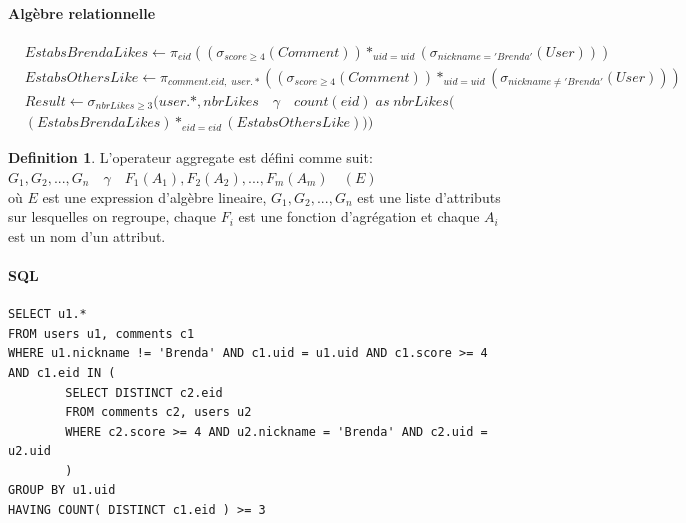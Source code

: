 \documentclass[11pt,a4paper]{report}
\begin{document}
\paragraph*{Algèbre relationnelle}
\begin{align*}
& EstabsBrendaLikes \leftarrow \pi_{eid} ( ( \sigma_{score \ge 4} (Comment)) *_{uid=uid} (\sigma_{nickname = 'Brenda'} (User)) ) \\
& EstabsOthersLike \leftarrow \pi_{comment.eid, \; user.*} ( ( \sigma_{score \ge 4} (Comment)) *_{uid=uid} (\sigma_{nickname \neq 'Brenda'} (User)) )\\ 
& Result \leftarrow \sigma_{nbrLikes \ge 3} (user.*, nbrLikes \quad \gamma \quad count(eid) \; as\;  nbrLikes ( \\
& (EstabsBrendaLikes)*_{eid=eid}(EstabsOthersLike)) )
\end{align*}

\theoremstyle{plain}
\newtheorem{thm}{Theorem}
\theoremstyle{definition}
\newtheorem{defn}[thm]{Definition}

\begin{defn} L'operateur aggregate est défini comme suit: \\
\begin{math}G_1, G_2, ..., G_n \quad \gamma \quad F_1(A_1), F_2(A_2), ..., F_m(A_m) \quad (E) \end{math} \\
où \begin{math} E \end{math} est une expression d'algèbre lineaire,  \begin{math}G_1, G_2, ..., G_n \end{math} est une liste d'attributs sur lesquelles on regroupe, chaque \begin{math} F_i \end{math} est une fonction d'agrégation et chaque \begin{math} A_i \end{math} est un nom d'un attribut. \end{defn}

\paragraph*{SQL}
\begin{verbatim}
SELECT u1.*
FROM users u1, comments c1
WHERE u1.nickname != 'Brenda' AND c1.uid = u1.uid AND c1.score >= 4 AND c1.eid IN (
        SELECT DISTINCT c2.eid
        FROM comments c2, users u2
        WHERE c2.score >= 4 AND u2.nickname = 'Brenda' AND c2.uid = u2.uid
        )
GROUP BY u1.uid
HAVING COUNT( DISTINCT c1.eid ) >= 3
\end{verbatim}
\end{document}
